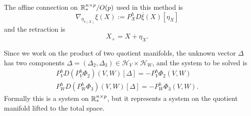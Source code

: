 The affine connection on $\mathbb{R}^{n \times p}_{*} / O(p)$ used in this method is 
\begin{equation}
    \nabla_{\eta_{\pi(X)}} \xi (X) := P^h_X D \bar{\xi}(X)[\eta_X]
\end{equation}
and the retraction is
\begin{equation}
    X_{+} = X + \eta_X.
\end{equation}

Since we work on the product of two quotient manifolds,
the unknown vector $\Delta$ has two components 
$\Delta = (\Delta_2, \Delta_3) \in \mathcal{H}_V \times \mathcal{H}_W$, and
the system to be solved is
\begin{eqnarray}
    P^h_V D (P^h_V \Phi_2)(V, W)[\Delta] = - P^h_V \Phi_2(V, W) \\
    P^h_W D (P^h_W \Phi_3)(V, W)[\Delta] = - P^h_W \Phi_3(V, W). 
\end{eqnarray}
Formally this is a system on $\mathbb{R}^{n \times p}_{*}$, but it represents
a system on the quotient manifold lifted to the total space.


